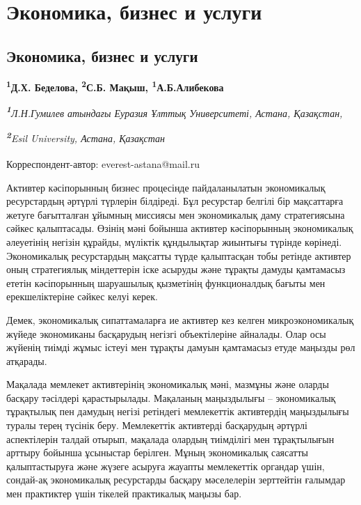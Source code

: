\newpage
\let\cleardoublepage\clearpage
\part{Экономика, бизнес и услуги}
\let\cleardoublepage\clearpage
\chapter{Экономика, бизнес и услуги}

\begin{articleheader}

{\bfseries
\textsuperscript{1}Д.Х. Беделова\authorid,
\textsuperscript{2}С.Б. Мақыш\authorid,
\textsuperscript{1}А.Б.Алибекова\authorid}
\end{articleheader}

\begin{affiliation}
\emph{{\bfseries \textsuperscript{1}}Л.Н.Гумилев атындағы Еуразия Ұлттық Университеті, Астана, Қазақстан,}

\emph{{\bfseries \textsuperscript{2}}Esil University, Астана, Қазақстан}

\raggedright \textsuperscript{\envelope }Корреспондент-автор: everest-astana@mail.ru
\end{affiliation}

Активтер кәсіпорынның бизнес процесінде пайдаланылатын экономикалық
ресурстардың әртүрлі түрлерін білдіреді. Бұл ресурстар белгілі бір
мақсаттарға жетуге бағытталған ұйымның миссиясы мен экономикалық даму
стратегиясына сәйкес қалыптасады. Өзінің мәні бойынша активтер
кәсіпорынның экономикалық әлеуетінің негізін құрайды, мүліктік
құндылықтар жиынтығы түрінде көрінеді. Экономикалық ресурстардың
мақсатты түрде қалыптасқан тобы ретінде активтер оның стратегиялық
міндеттерін іске асыруды және тұрақты дамуды қамтамасыз ететін
кәсіпорынның шаруашылық қызметінің функционалдық бағыты мен
ерекшеліктеріне сәйкес келуі керек.

Демек, экономикалық сипаттамаларға ие активтер кез келген
микроэкономикалық жүйеде экономиканы басқарудың негізгі объектілеріне
айналады. Олар осы жүйенің тиімді жұмыс істеуі мен тұрақты дамуын
қамтамасыз етуде маңызды рөл атқарады.

Мақалада мемлекет активтерінің экономикалық мәні, мазмұны және оларды
басқару тәсілдері қарастырылады. Мақаланың маңыздылығы -- экономикалық
тұрақтылық пен дамудың негізі ретіндегі мемлекеттік активтердің
маңыздылығы туралы терең түсінік беру. Мемлекеттік активтерді басқарудың
әртүрлі аспектілерін талдай отырып, мақалада олардың тиімділігі мен
тұрақтылығын арттыру бойынша ұсыныстар берілген. Мұның экономикалық
саясатты қалыптастыруға және жүзеге асыруға жауапты мемлекеттік органдар
үшін, сондай-ақ экономикалық ресурстарды басқару мәселелерін зерттейтін
ғалымдар мен практиктер үшін тікелей практикалық маңызы бар.

